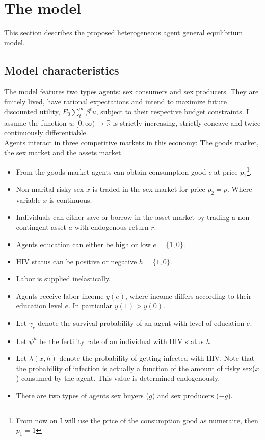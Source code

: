\section{The model}\label{sec4}
This section describes the proposed heterogeneous agent general equilibrium model.
\subsection{Model characteristics}
The model features two types agents: sex consumers and sex producers. They are finitely lived, have rational expectations and intend to maximize future discounted utility, $E_{0}\sum_{t}^{\infty}\beta^{t}u$, subject to their respective budget constraints. I assume the function $u:[0,\infty)\to \mathbb{R}$ is strictly increasing, strictly concave and twice continuously differentiable. \\
 Agents interact in three competitive markets in this economy: The goods market, the sex market and the assets market.  
\begin{itemize}
\item From the goods market agents can obtain consumption good $c$ at price $p_{1}$\footnote{From now on I will use the price of the consumption good as numeraire, then $p_{1}=1$}. 
\item Non-marital risky sex $x$ is traded in the sex market for price $p_{2}=p$. Where variable $x$ is continuous.
\item Individuals can either save or borrow in the asset market by trading a non-contingent asset $a$ with endogenous return $r$.
\item Agents education can either be high or low $e=\{1,0\}$.
\item HIV status can be positive or negative $h=\{1,0\}$.
\item Labor is supplied inelastically.
\item Agents receive labor income $y(e)$, where income differs according to their education level $e$. In particular $y(1)>y(0)$.
\item Let $\gamma_{e}$ denote the survival probability of an agent with level of education $e$.
\item Let $\psi^{h}$ be the fertility rate of an individual with HIV status $h$.
\item Let $\lambda(x,h)$ denote the probability of getting infected with HIV. Note that the probability of infection is actually a function of the amount of risky sex($x$) consumed by the agent. This value is determined endogenously.
\item There are two types of agents sex buyers ($g$) and sex producers ($-g$).  
\end{itemize}
